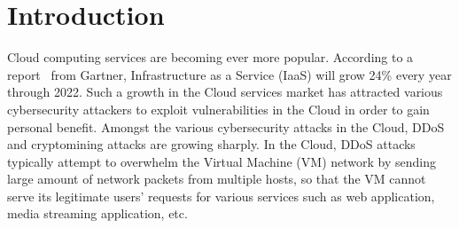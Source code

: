 \section{Introduction}
\label{sec:introduction}
\noindent Cloud computing services are becoming ever more popular. According to a report~\cite{gartner} from Gartner, Infrastructure as a Service (IaaS) will grow 24\% every year through 2022.
Such a growth in the Cloud services market has attracted various cybersecurity attackers to exploit vulnerabilities in the Cloud in order to gain personal benefit. %
Amongst the various cybersecurity attacks in the Cloud, DDoS and cryptomining attacks are growing sharply. 
In the Cloud, DDoS attacks typically attempt to overwhelm the Virtual Machine (VM) network by sending large amount of network packets from multiple hosts, so that the VM cannot serve its legitimate users' requests for various services such as web application, media streaming application, etc. 
